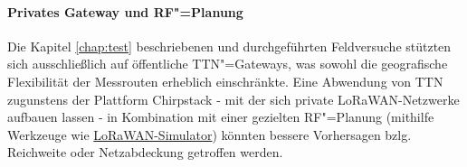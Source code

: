 \paragraph{Privates Gateway und RF"=Planung}
Die Kapitel \ref{chap:test} beschriebenen und  durchgeführten Feldversuche stützten sich ausschließlich auf öffentliche TTN"=Gateways, was sowohl die
geografische Flexibilität der Messrouten erheblich einschränkte. Eine Abwendung von TTN zugunstens der Plattform Chirpstack - 
mit der sich private LoRaWAN-Netzwerke aufbauen lassen - in Kombination mit einer gezielten RF"=Planung (mithilfe Werkzeuge wie
\href{https://github.com/UniCT-ARSLab/LWN-Simulator}{LoRaWAN-Simulator}) könnten bessere Vorhersagen bzlg. Reichweite oder
Netzabdeckung getroffen werden.


